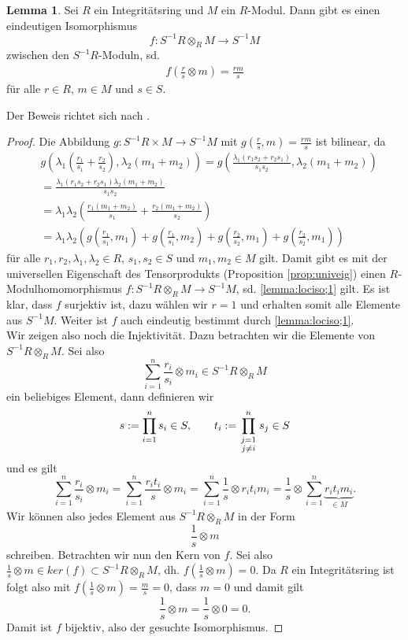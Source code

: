 \documentclass[11pt,titlepage]{article}
\theoremstyle{definition}
\newtheorem{lemma}[theorem]{Lemma}
\theoremstyle{remark}
\begin{document}
	\begin{lemma} \label{lemma:lociso}
		Sei $R$ ein Integritätsring und $M$ ein $R$-Modul. Dann gibt es einen 
		eindeutigen Isomorphismus
		\[f:S^{-1}R\otimes_R M\to S^{-1}M\]
		zwischen den $S^{-1}R$-Moduln, sd.
		\begin{align}
			f\left(\frac{r}{s}\otimes m\right)=\frac{rm}{s} \label{lemma:lociso;1}
		\end{align}
		für alle $r\in R$, $m\in M$ und $s\in S$.
	\end{lemma}
	
	Der Beweis richtet sich nach \cite[Proposition 3.5]{introductiontocomalg}.
	
	\begin{proof}
		Die Abbildung $g:S^{-1}R\times M\to S^{-1}M$ mit $g\left(\frac{r}{s},m\right)=\frac{rm}{s}$ ist bilinear, da 
		\begin{align*}
			&g\left(\lambda_1\left(\frac{r_1}{s_1}+\frac{r_2}{s_2}\right),
			\lambda_2 (m_1+m_2)\right)=g\left(\frac{\lambda_1 (r_1 s_2+r_2
			 s_1)}{s_1s_2},\lambda_2(m_1+m_2)\right) \\
			&=\frac{\lambda_1(r_1s_2+r_2s_1)\lambda_2(m_1+m_2)}{s_1s_2}\\
			&=\lambda_1\lambda_2\left(\frac{r_1(m_1+m_2)}{s_1}+
			\frac{r_2(m_1+m_2)}{s_2}\right) \\
			&=\lambda_1\lambda_2 \left(g\left(\frac{r_1}{s_1},m_1\right)
			+g\left(\frac{r_1}{s_1},m_2\right)+g\left(\frac{r_2}{s_2},m_1\right)+
			g\left(\frac{r_2}{s_2},m_1\right)\right)
		\end{align*}
		für alle $r_1,r_2,\lambda_1,\lambda_2\in R$, $s_1,s_2 \in S$ und 
		$m_1,m_2\in M$ gilt. Damit gibt es mit der universellen Eigenschaft 
		des Tensorprodukts (Proposition \ref{prop:univeig}) einen 
		$R$-Modulhomomorphismus $f:S^{-1}R\otimes_R M\to S^{-1}M$, sd. 
		\ref{lemma:lociso;1} gilt. Es ist klar, dass $f$ surjektiv ist, 
		dazu wählen wir $r=1$ und erhalten somit alle Elemente aus 
		$S^{-1}M$. Weiter ist $f$ auch eindeutig bestimmt durch 
		\ref{lemma:lociso;1}. \\
		Wir zeigen also noch die Injektivität. Dazu betrachten wir die 
		Elemente von $S^{-1}R\otimes_R M$. Sei also 
		\[\sum_{i=1}^n \frac{r_i}{s_i}\otimes m_i \in S^{-1}R\otimes_R M\]
		ein beliebiges Element, dann definieren wir
		\[s:=\prod_{i=1}^n s_i\in S,\qquad t_i:=\prod_{\genfrac{}{}{0pt}{1}{j=1}{j\neq i}}^n s_j\in S\]
		und es gilt 
		\[\sum_{i=1}^n \frac{r_i}{s_i}\otimes m_i =
		\sum_{i=1}^n \frac{r_it_i}{s}\otimes m_i =\sum_{i=1}^n 
		\frac{1}{s}\otimes r_i t_i m_i =\frac{1}{s}\otimes\sum_{i=1}^n
		\underbrace{r_it_im_i}_{\in M}.\]
		Wir können also jedes Element aus $S^{-1}R\otimes_R M$ in der Form 
		\[\frac{1}{s}\otimes m\]
		schreiben. Betrachten wir nun den Kern von $f$. Sei also 
		$\frac{1}{s}\otimes m \in ker(f)\subset S^{-1}R\otimes_R M$, dh. 
		$f\left(\frac{1}{s}\otimes m\right)=0$. Da $R$ ein 
		Integritätsring ist folgt also mit $f\left(\frac{1}{s}\otimes m\right)=\frac{m}{s}=0$, dass $m=0$ und damit gilt
		\[\frac{1}{s}\otimes m =\frac{1}{s}\otimes 0=0.\]
		Damit ist $f$ bijektiv, also der gesuchte Isomorphismus.
	\end{proof}
	
\end{document}
